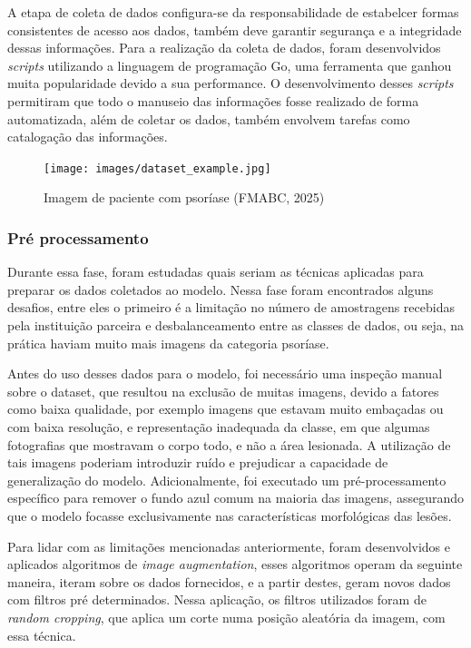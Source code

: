 A etapa de coleta de dados configura-se da responsabilidade de estabelcer formas consistentes de acesso aos dados, também deve garantir segurança e a integridade dessas informações. Para a realização da coleta de dados, foram desenvolvidos \textit{scripts} utilizando a linguagem de programação Go, uma ferramenta que ganhou muita popularidade devido a sua performance. O desenvolvimento desses \textit{scripts} permitiram que todo o manuseio das informações fosse realizado de forma automatizada, além de coletar os dados, também envolvem tarefas como catalogação das informações.


\begin{figure}[h] %
    \centering
    \texttt{[image: images/dataset\_example.jpg]}
    \caption{Imagem de paciente com psoríase (FMABC, 2025)}
    \label{fig:ex-dataset}
\end{figure}

\subsubsection{Pré processamento}

Durante essa fase, foram estudadas quais seriam as técnicas aplicadas para preparar os dados coletados ao modelo. Nessa fase foram encontrados alguns desafios, entre eles o primeiro é a limitação no número de amostragens recebidas pela instituição parceira e desbalanceamento entre as classes de dados, ou seja, na prática haviam muito mais imagens da categoria psoríase.

Antes do uso desses dados para o modelo, foi necessário uma inspeção manual sobre o dataset, que resultou na exclusão de muitas imagens, devido a fatores como baixa qualidade, por exemplo imagens que estavam muito embaçadas ou com baixa resolução, e representação inadequada da classe, em que algumas fotografias que mostravam o corpo todo, e não a área lesionada. A utilização de tais imagens poderiam introduzir ruído e prejudicar a capacidade de generalização do modelo. Adicionalmente, foi executado um pré-processamento específico para remover o fundo azul comum na maioria das imagens, assegurando que o modelo focasse exclusivamente nas características morfológicas das lesões.

Para lidar com as limitações mencionadas anteriormente, foram desenvolvidos e aplicados algoritmos de \textit{image augmentation}, esses algoritmos operam da seguinte maneira, iteram sobre os dados fornecidos, e a partir destes, geram novos dados com filtros pré determinados. Nessa aplicação, os filtros utilizados foram de \textit{random cropping}, que aplica um corte numa posição aleatória da imagem, com essa técnica.

